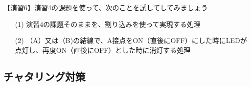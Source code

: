 \documentclass[uplatex,a4paper,11pt,oneside,openany]{jsbook}
\begin{document}
【演習6】演習4の課題を使って、次のことを試してしてみましょう

\begin{enumerate}
\item[(1)] 演習4の課題そのままを、割り込みを使って実現する処理
\item[(2)] （A）又は（B)の結線で、A接点をON（直後にOFF）にした時にLEDが点灯し、再度ON（直後にOFF）とした時に消灯する処理
\end{enumerate}

\subsection{チャタリング対策}

\end{document}
